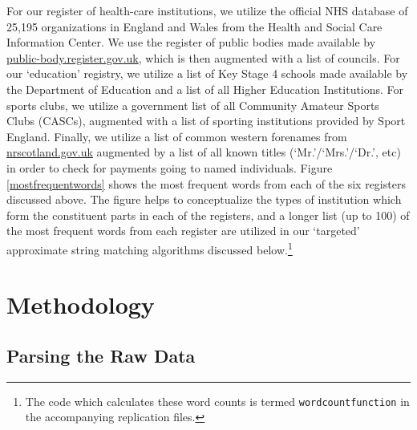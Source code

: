 \documentclass[12pt]{article}
\begin{document}
For our register of health-care institutions, we utilize the official NHS database of 25,195 organizations in England and Wales from the Health and Social Care Information Center. We use the register of public bodies made available by \url{public-body.register.gov.uk}, which is then augmented with a list of councils. For our ‘education’ registry, we utilize a list of Key Stage 4 schools made available by the Department of Education and a list of all Higher Education Institutions. For sports clubs, we utilize a government list of all Community Amateur Sports Clubs (CASCs), augmented with a list of sporting institutions provided by Sport England. Finally, we utilize a list of common western forenames from \url{nrscotland.gov.uk} augmented by a list of all known titles (`Mr.'/`Mrs.'/`Dr.', etc) in order to check for payments going to named individuals. Figure \ref{mostfrequentwords} shows the most frequent words from each of the six registers discussed above. The figure helps to conceptualize the types of institution which form the constituent parts in each of the registers, and a longer list (up to 100) of the most frequent words from each register are utilized in our `targeted' approximate string matching algorithms discussed below.\footnote{The code which calculates these word counts is termed \texttt{wordcountfunction} in the accompanying replication files.}

\section{Methodology}\label{methodology}

\subsection{Parsing the Raw Data}
\end{document}
